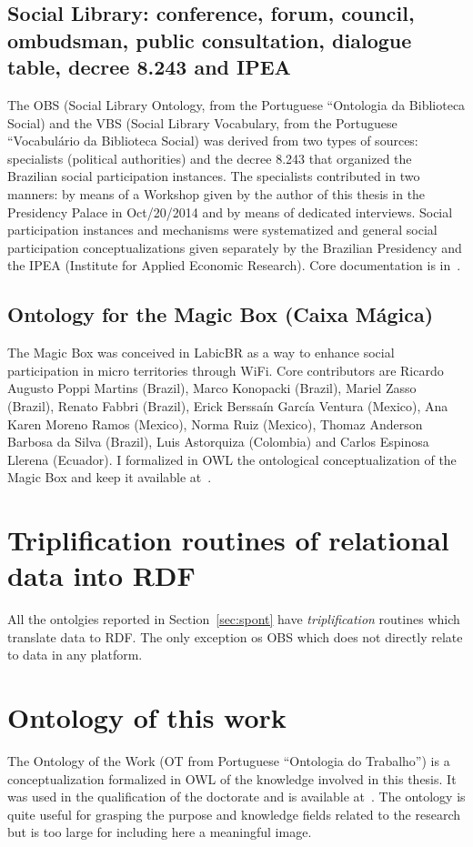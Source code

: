 \begin{apendicesenv}
\subsection{Social Library: conference, forum, council, ombudsman, public consultation, dialogue table, decree 8.243 and IPEA}
The OBS (Social Library Ontology, from the Portuguese ``Ontologia da Biblioteca Social)
and the VBS (Social Library Vocabulary, from the Portuguese ``Vocabulário da Biblioteca Social)
was derived from two types of sources: specialists (political authorities)
and the decree 8.243 that organized the Brazilian social participation instances.
The specialists contributed in two manners: by means of a Workshop given by the author 
of this thesis in the Presidency Palace in Oct/20/2014
and by means of dedicated interviews.
Social participation instances and mechanisms were systematized and general
social participation conceptualizations given separately by the Brazilian Presidency
and the IPEA (Institute for Applied Economic Research).
Core documentation is in~\cite{opa,vocabP}.

\subsection{Ontology for the Magic Box (Caixa Mágica)}\label{sec:mb}
The Magic Box was conceived in LabicBR as a way to enhance social participation
in micro territories through WiFi.
Core contributors are Ricardo Augusto Poppi Martins (Brazil), Marco Konopacki (Brazil),
Mariel Zasso (Brazil), Renato Fabbri (Brazil), Erick Berssaín García Ventura (Mexico),
Ana Karen Moreno Ramos (Mexico), Norma Ruiz (Mexico),
Thomaz Anderson Barbosa da Silva (Brazil), Luis Astorquiza (Colombia) and Carlos Espinosa Llerena (Ecuador).
I formalized in OWL the ontological conceptualization of the Magic Box and keep it available at~\cite{caixamagica}.

\section{Triplification routines of relational data into RDF}
All the ontolgies reported in Section~\ref{sec:spont} have \emph{triplification}
routines which translate data to RDF.
The only exception os OBS which does not directly relate to data in any platform.

\section{Ontology of this work}
The Ontology of the Work (OT from Portuguese ``Ontologia do Trabalho'')
is a conceptualization formalized in OWL of the knowledge involved in this thesis.
It was used in the qualification of the doctorate and is available at~\cite{OT}.
The ontology is quite useful for grasping the purpose and knowledge fields related to
the research but is too large for including here a meaningful image.


\end{apendicesenv}
